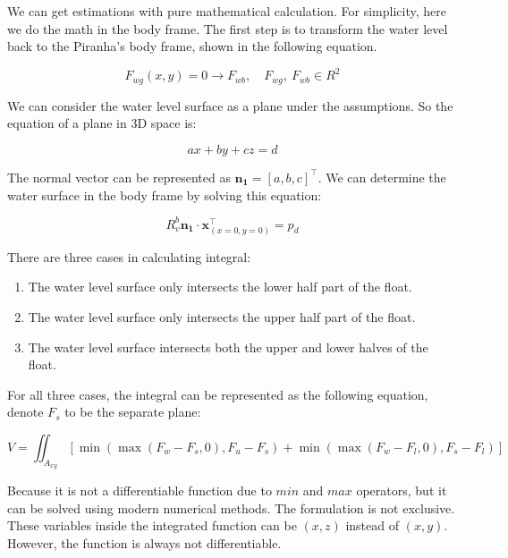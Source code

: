 We can get estimations with pure mathematical calculation. For simplicity, here we do the math in the body frame. The first step is to transform the water level back to the Piranha's body frame, shown in the following equation.

\begin{equation}
    F_{wg}(x,y)=0 \longrightarrow F_{wb},\quad F_{wg}, \ F_{wb} \in R^2 
\end{equation}

We can consider the water level surface as a plane under the assumptions. So the equation of a plane in 3D space is:

\begin{equation}
    ax+by+cz=d
\end{equation}

The normal vector can be represented as $\boldsymbol{n_1}=[a, b, c]^\top$. We can determine the water surface in the body frame by solving this equation:

\begin{equation}
        R_v^b\boldsymbol{n_1} \cdot \boldsymbol{x}^\top_{(x=0,y=0)} = p_d
\end{equation}

There are three cases in calculating integral:

\begin{enumerate}
    \item The water level surface only intersects the lower half part of the float.
    \item The water level surface only intersects the upper half part of the float.
    \item The water level surface intersects both the upper and lower halves of the float.
\end{enumerate}

For all three cases, the integral can be represented as the following equation, denote $F_s$ to be the separate plane:

\begin{equation}
    V=\iint_{A_{xy}} \left[\min(\max(F_w-F_s,0),F_u-F_s) + \min(\max(F_w-F_l,0),F_s-F_l)\right]
\end{equation}

Because it is not a differentiable function due to $min$ and $max$ operators, but it can be solved using modern numerical methods. The formulation is not exclusive. These variables inside the integrated function can be $(x,z)$ instead of $(x,y)$. However, the function is always not differentiable. 

